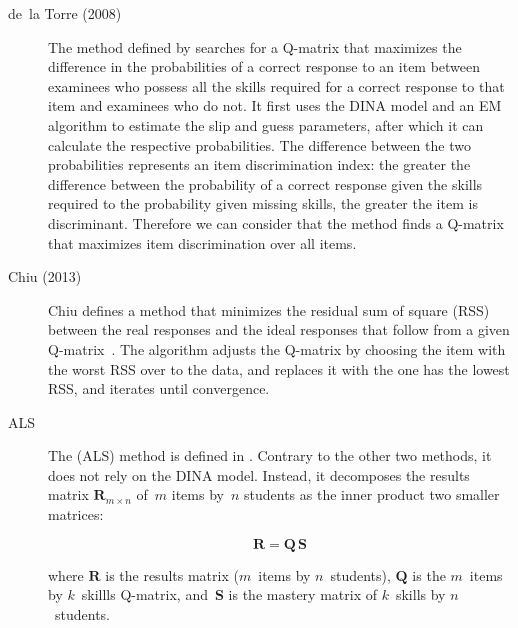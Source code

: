 \begin{description}


\item[de~la Torre (2008)] The method defined by \citet{delaTorre2008} searches for a Q-matrix that maximizes the difference in the probabilities of a correct response to an item between examinees who possess all the skills required for a correct response to that item and examinees who do not. It first uses the DINA model and an EM algorithm to estimate the slip and guess parameters, after which it can calculate the respective probabilities.  The difference between the two probabilities represents an item discrimination index: the greater the difference between the probability of a correct response given the skills required to the probability given missing skills, the greater the item is discriminant. Therefore we can consider that the method finds a Q-matrix that maximizes item discrimination over all items.


\item[Chiu (2013)] Chiu defines a method that minimizes the residual sum of square (RSS) between the real responses and the ideal responses that follow from a given Q-matrix~\citep{chiu2013statistical}.  The algorithm adjusts the Q-matrix by choosing the item with the worst RSS over to the data, and replaces it with the one has the lowest RSS, and iterates until convergence.

\item[ALS] The  (ALS) method is defined in \citep{Desmarais2013aied}.  Contrary to the other two methods, it does not rely on the DINA model.  Instead, it decomposes the results matrix $\mathbf{R}_{m \times n}$ of~$m$ items by~$n$ students as the inner product two smaller matrices:

\begin{equation}
  \mathbf{{R}} = \mathbf{Q} \, \mathbf{S} \label{eq:nmf}
\end{equation}

where $\mathbf{R}$ is the results matrix ($m$~items by $n$~students),  $\mathbf{Q}$ is the $m$~items by $k$~skillls Q-matrix, and~$\mathbf{S}$ is the mastery matrix of $k$~skills by $n$~students.

\end{description}
